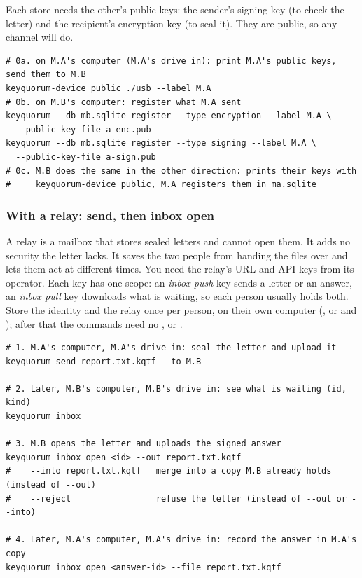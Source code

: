 Each store needs the other's public keys: the sender's signing key (to check
the letter) and the recipient's encryption key (to seal it). They are
public, so any channel will do.

\begin{lstlisting}
# 0a. on M.A's computer (M.A's drive in): print M.A's public keys, send them to M.B
keyquorum-device public ./usb --label M.A
# 0b. on M.B's computer: register what M.A sent
keyquorum --db mb.sqlite register --type encryption --label M.A \
  --public-key-file a-enc.pub
keyquorum --db mb.sqlite register --type signing --label M.A \
  --public-key-file a-sign.pub
# 0c. M.B does the same in the other direction: prints their keys with
#     keyquorum-device public, M.A registers them in ma.sqlite
\end{lstlisting}

\subsubsection*{With a relay: send, then inbox open}

A relay is a mailbox that stores sealed letters and cannot open them. It
adds no security the letter lacks. It saves the two people from handing
the files over and lets them act at different times. You need the relay's
URL and API keys from its operator. Each key has one scope: an
\emph{inbox push} key sends a letter or an answer, an \emph{inbox pull} key
downloads what is waiting, so each person usually holds both. Store the
identity and the relay once per person, on their own computer (\code{setup},
or \code{use} and \code{loadkey}); after that the commands need no
\flag{--as}, \flag{--slot} or \flag{--url}.

\begin{lstlisting}
# 1. M.A's computer, M.A's drive in: seal the letter and upload it
keyquorum send report.txt.kqtf --to M.B

# 2. Later, M.B's computer, M.B's drive in: see what is waiting (id, kind)
keyquorum inbox

# 3. M.B opens the letter and uploads the signed answer
keyquorum inbox open <id> --out report.txt.kqtf
#    --into report.txt.kqtf   merge into a copy M.B already holds (instead of --out)
#    --reject                 refuse the letter (instead of --out or --into)

# 4. Later, M.A's computer, M.A's drive in: record the answer in M.A's copy
keyquorum inbox open <answer-id> --file report.txt.kqtf
\end{lstlisting}

